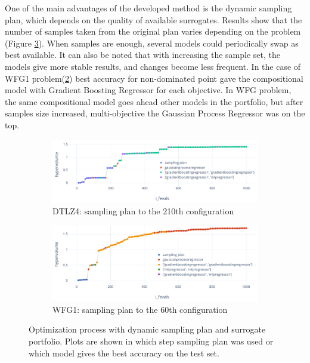 

    One of the main advantages of the developed method is the dynamic sampling plan, which depends on the quality of available surrogates. Results show that the number of samples taken from the original plan varies depending on the problem (Figure \ref{fig:changing_models}).
    When samples are enough, several models could periodically swap as best available. It can also be noted that with increasing the sample set, the models give more stable results, and changes become less frequent. In the case of WFG1 problem(\ref{fig:wfg1_models_60}) best accuracy for non-dominated point gave the compositional model with Gradient Boosting Regressor for each objective. In WFG problem, the same compositional model goes ahead other models in the portfolio, but after samples size increased, multi-objective the Gaussian Process Regressor was on the top.
    \begin{figure}
        \centering
        \begin{subfigure}{\textwidth}
            \includegraphics[width=\textwidth]{content/images/dtlz4_models}
            \caption{DTLZ4: sampling plan to the 210th configuration}
            \label{fig:dtlz4_models_210}
        \end{subfigure}
        
        \begin{subfigure}{\textwidth}
            \includegraphics[width=\textwidth]{content/images/wfg1_models}
            \caption{WFG1: sampling plan to the 60th configuration}
            \label{fig:wfg1_models_60}
        \end{subfigure} 

        \caption[Optimization process with dynamic sampling plan and surrogate portfolio.]{Optimization process with dynamic sampling plan and surrogate portfolio. Plots are shown in which step sampling plan was used or which model gives the best accuracy on the test set.}
        \label{fig:changing_models}    
    \end{figure}



